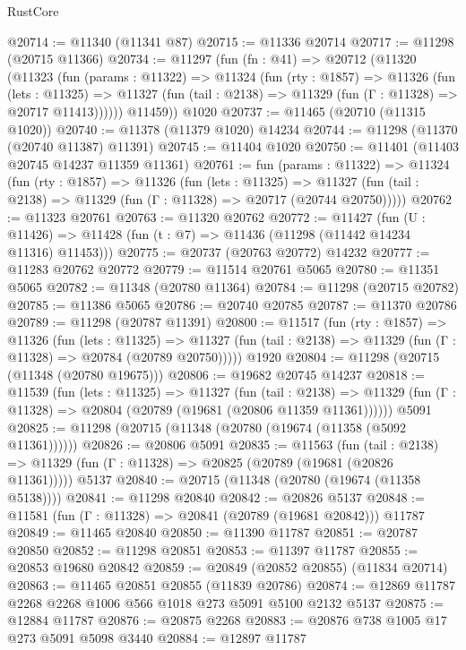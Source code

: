 \begin{lexlean}{RustCore}
\begin{coremodule}
@20714 := @11340 (@11341 @87)
@20715 := @11336 @20714
@20717 := @11298 (@20715 @11366)
@20734 := @11297
    (fun (fn : @41) =>
    @20712
      (@11320
        (@11323
          (fun (params : @11322) =>
          @11324
            (fun (rty : @1857) =>
            @11326
              (fun (lets : @11325) =>
              @11327 (fun (tail : @2138) => @11329 (fun (Γ : @11328) => @20717 @11413))))))
        @11459))
    @1020
@20737 := @11465 (@20710 (@11315 @1020))
@20740 := @11378 (@11379 @1020) @14234
@20744 := @11298 (@11370 (@20740 @11387) @11391)
@20745 := @11404 @1020
@20750 := @11401 (@11403 @20745 @14237 @11359 @11361)
@20761 := fun (params : @11322) =>
  @11324
    (fun (rty : @1857) =>
    @11326
      (fun (lets : @11325) =>
      @11327 (fun (tail : @2138) => @11329 (fun (Γ : @11328) => @20717 (@20744 @20750)))))
@20762 := @11323 @20761
@20763 := @11320 @20762
@20772 := @11427
    (fun (U : @11426) => @11428 (fun (t : @7) => @11436 (@11298 (@11442 @14234 @11316) @11453)))
@20775 := @20737 (@20763 @20772) @14232
@20777 := @11283 @20762 @20772
@20779 := @11514 @20761 @5065
@20780 := @11351 @5065
@20782 := @11348 (@20780 @11364)
@20784 := @11298 (@20715 @20782)
@20785 := @11386 @5065
@20786 := @20740 @20785
@20787 := @11370 @20786
@20789 := @11298 (@20787 @11391)
@20800 := @11517
    (fun (rty : @1857) =>
    @11326
      (fun (lets : @11325) =>
      @11327 (fun (tail : @2138) => @11329 (fun (Γ : @11328) => @20784 (@20789 @20750)))))
    @1920
@20804 := @11298 (@20715 (@11348 (@20780 @19675)))
@20806 := @19682 @20745 @14237
@20818 := @11539
    (fun (lets : @11325) =>
    @11327
      (fun (tail : @2138) =>
      @11329 (fun (Γ : @11328) => @20804 (@20789 (@19681 (@20806 @11359 @11361))))))
    @5091
@20825 := @11298 (@20715 (@11348 (@20780 (@19674 (@11358 (@5092 @11361))))))
@20826 := @20806 @5091
@20835 := @11563
    (fun (tail : @2138) => @11329 (fun (Γ : @11328) => @20825 (@20789 (@19681 (@20826 @11361)))))
    @5137
@20840 := @20715 (@11348 (@20780 (@19674 (@11358 @5138))))
@20841 := @11298 @20840
@20842 := @20826 @5137
@20848 := @11581 (fun (Γ : @11328) => @20841 (@20789 (@19681 @20842))) @11787
@20849 := @11465 @20840
@20850 := @11390 @11787
@20851 := @20787 @20850
@20852 := @11298 @20851
@20853 := @11397 @11787
@20855 := @20853 @19680 @20842
@20859 := @20849 (@20852 @20855) (@11834 @20714)
@20863 := @11465 @20851 @20855 (@11839 @20786)
@20874 := @12869 @11787 @2268 @2268 @1006 @566 @1018 @273 @5091 @5100 @2132 @5137
@20875 := @12884 @11787
@20876 := @20875 @2268
@20883 := @20876 @738 @1005 @17 @273 @5091 @5098 @3440
@20884 := @12897 @11787

\end{coremodule}
\end{lexlean}
